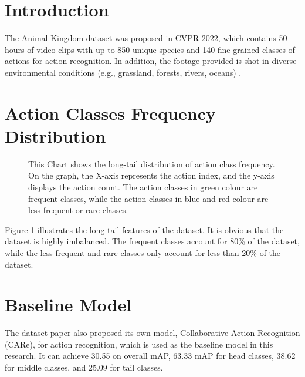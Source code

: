 \section{Introduction}
The Animal Kingdom dataset was proposed in CVPR 2022, which contains 50 hours of video clips with up to 850 unique species and 140 fine-grained classes of actions for action recognition. In addition, the footage provided is shot in diverse environmental conditions (e.g., grassland, forests, rivers, oceans) \parencite{ng2022animal}.

\section{Action Classes Frequency Distribution}

\begin{figure}[ht]
    \centering
    \resizebox{1.0\textwidth}{!}{}
    \caption[Action Classes Frequency Distribution]{This Chart shows the long-tail distribution of action class frequency. On the graph, the X-axis represents the action index, and the y-axis displays the action count. The action classes in green colour are frequent classes, while the action classes in blue and red colour are less frequent or rare classes.}
    \label{fig:classfreqdist}
\end{figure}

Figure \ref{fig:classfreqdist} illustrates the long-tail features of the dataset. It is obvious that the dataset is highly imbalanced. The frequent classes account for 80\% of the dataset, while the less frequent and rare classes only account for less than 20\% of the dataset.

\section{Baseline Model}
The dataset paper also proposed its own model, Collaborative Action Recognition (CARe), for action recognition, which is used as the baseline model in this research. It can achieve 30.55 on overall mAP, 63.33 mAP for head classes, 38.62 for middle classes, and 25.09 for tail classes. 
   